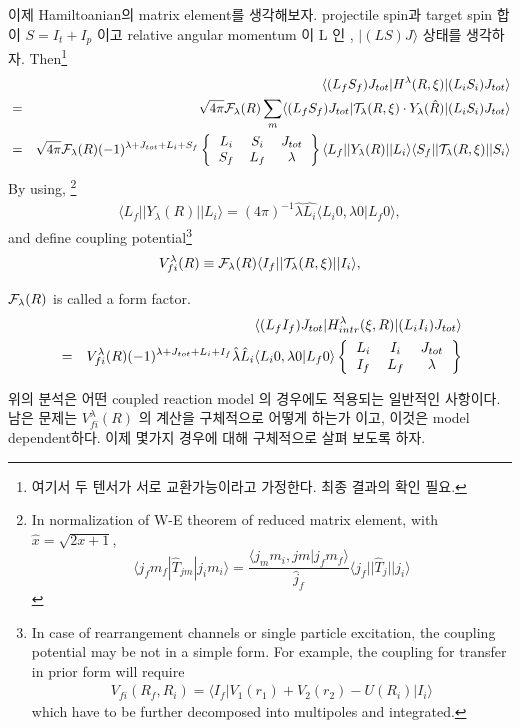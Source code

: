 \documentclass[11pt]{book}
\def\la{\langle}
\def\ra{\rangle}
\newcommand{\bea}{\begin{eqnarray}}
\newcommand{\eea}{\end{eqnarray}}
\newcommand{\no}{\nonumber \\}
\newcommand{\sixjsymbol}[6]{\left\{\begin{tabular}{ccc} {$#1$}&{$#2$}&{$#3$}\\
                             {$#4$}&{$#5$}&{$#6$} \end{tabular}\right\}}
\begin{document}
이제 Hamiltoanian의 matrix element를 생각해보자.  projectile spin과 target spin 합이
$S=I_t+I_p$ 이고 relative angular momentum 이 L 인 , $|(LS)J\ra$ 상태를 생각하자. 
Then\footnote{
여기서 두 텐서가 서로 교환가능이라고 가정한다. 최종 결과의 확인 필요. 
}
\bea 
& &\la (L_fS_f)J_{tot}|H^\lambda(R,\xi)|(L_iS_i)J_{tot}\ra \no
&=& \sqrt{4\pi} {\cal F}_\lambda(R)\sum_{m} \la (L_f S_f)J_{tot}| {\cal T}_{\lambda}(R,\xi)\cdot Y_\lambda(\hat{R})|(L_iS_i)J_{tot}\ra \no
&=& \sqrt{4\pi} {\cal F}_\lambda(R) (-1)^{\lambda+J_{tot}+L_i+S_f}
       \sixjsymbol{L_i}{S_i}{J_{tot}}{S_f}{L_f}{\lambda}\la L_f|| Y_{\lambda}(R)|| L_i\ra \la S_f|| {\cal T}_{\lambda}(R,\xi)|| S_i\ra
\eea 
By using, \footnote{In normalization of W-E theorem of reduced matrix element, with $\hat{x}=\sqrt{2x+1}$, 
$$\la j_f m_f | \hat{T}_{jm}| j_i m_i\ra =\frac{\la j_m m_i, jm|j_f m_f\ra}{\hat{j}_f} \la j_f|| \hat{T}_j|| j_i\ra  $$
}
\bea
\la L_f|| Y_\lambda(R)|| L_i\ra =(4\pi)^{-1} \hat{\lambda}\hat{L_i} \la L_i 0, \lambda 0| L_f 0\ra, 
\eea 
and define coupling potential\footnote{
In case of rearrangement channels or single particle excitation,
the coupling potential may be not in a simple form. For example,
the coupling for transfer in prior form will require
\bea 
V_{fi}(R_f,R_i)=\la I_f | V_1(r_1)+V_2(r_2)-U(R_i)| I_i\ra 
\eea 
which have to be further decomposed into multipoles and integrated. 
}  
\bea 
V^\lambda_{fi}(R)\equiv {\cal F}_\lambda(R)\la I_f || {\cal T}_{\lambda}(R,\xi)|| I_i\ra,
\eea 

${\cal F}_\lambda(R)$ is called a form factor. 
\bea 
& & \la (L_f I_f) J_{tot}|H_{intr}^\lambda(\xi,R)|(L_i I_i)J_{tot}\ra  \no 
&=& V^\lambda_{fi}(R) (-1)^{\lambda+J_{tot}+L_i+I_f}\hat{\lambda}\hat{L}_i\la L_i 0,\lambda 0|L_f 0\ra 
      \sixjsymbol{L_i}{I_i}{J_{tot}}{I_f}{L_f}{\lambda} 
\eea 

위의 분석은 어떤 coupled reaction model 의 경우에도 적용되는 일반적인 사항이다.
남은 문제는 $V^\lambda_{fi}(R)$ 의 계산을 구체적으로 어떻게 하는가 이고,
이것은 model dependent하다. 이제 몇가지 경우에 대해 구체적으로 살펴 보도록 하자. 
\end{document}
